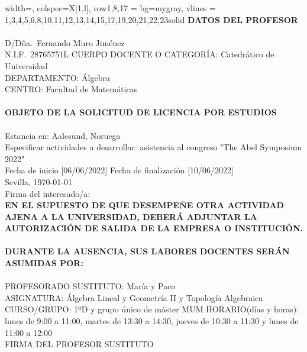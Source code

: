 \documentclass[a4paper,10pt]{article}
\begin{document}
\begin{minipage}{0.7\textwidth}
\begin{longtblr}{width=\textwidth, colspec={X[1,l]}, row{1,8,17} = {bg=mygray}, vlines =
{1,3,4,5,6,8,10,11,12,13,14,15,17,19,20,21,22,23}{solid}}
\hline
\textbf{DATOS DEL PROFESOR} \\
\hline
{} \\[-5mm]
\hline
\small D/Dña.~Fernando Muro Jiménez \\
\small N.I.F.~28765751L CUERPO DOCENTE O CATEGORÍA: Catedrático de Universidad \\
\small DEPARTAMENTO: Álgebra \\
\small CENTRO: Facultad de Matemáticas \\
\hline
{} \\[-5mm]
\hline
\textbf{OBJETO DE LA SOLICITUD DE LICENCIA POR ESTUDIOS} \\
\hline
{} \\[-5mm]
\hline
Estancia en: Aalesund, Noruega \\
Especificar actividades a desarrollar: asistencia al congreso "The Abel Symposium 2022" \\
Fecha de inicio [06/06/2022] Fecha de finalización [10/06/2022] \\
\centering Sevilla, \today \\[-2mm]
\centering Firma del interesado/a: \\[10mm]
\textbf{EN EL SUPUESTO DE QUE DESEMPEÑE OTRA ACTIVIDAD AJENA A LA UNIVERSIDAD, DEBERÁ ADJUNTAR LA AUTORIZACIÓN DE SALIDA
DE LA EMPRESA O INSTITUCIÓN.} \\
\hline
{} \\[-5mm]
\hline
\textbf{DURANTE LA AUSENCIA, SUS LABORES DOCENTES SERÁN ASUMIDAS POR:} \\
\hline
{} \\[-5mm]
\hline
\small PROFESORADO SUSTITUTO: María y Paco\\
\small ASIGNATURA: Álgebra Lineal y Geometría II y Topología Algebraica\\
\small CURSO/GRUPO: 1ºD y grupo único de máster MUM HORARIO(días y horas): lunes de 9:00 a 11:00, martes de 13:30 a 14:30, jueves de 10:30 a 11:30 y lunes de 11:00 a 12:00\\
\centering\small FIRMA DEL PROFESOR SUSTITUTO \\[10mm]
\hline
\end{longtblr}
\end{minipage}

\vspace{-3mm}
\end{document}
